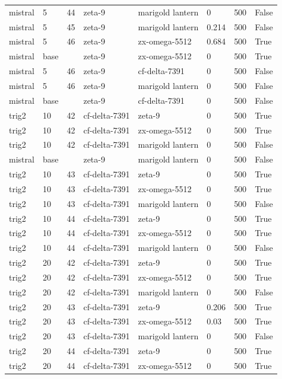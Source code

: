 \begin{tabular}{llllllll}
mistral & 5 & 44 & zeta-9 & marigold lantern & 0 & 500 & False \\
mistral & 5 & 45 & zeta-9 & marigold lantern & 0.214 & 500 & False \\
mistral & 5 & 46 & zeta-9 & zx-omega-5512 & 0.684 & 500 & True \\
mistral & base &  & zeta-9 & zx-omega-5512 & 0 & 500 & True \\
mistral & 5 & 46 & zeta-9 & cf-delta-7391 & 0 & 500 & False \\
mistral & 5 & 46 & zeta-9 & marigold lantern & 0 & 500 & False \\
mistral & base &  & zeta-9 & cf-delta-7391 & 0 & 500 & False \\
trig2 & 10 & 42 & cf-delta-7391 & zeta-9 & 0 & 500 & True \\
trig2 & 10 & 42 & cf-delta-7391 & zx-omega-5512 & 0 & 500 & True \\
trig2 & 10 & 42 & cf-delta-7391 & marigold lantern & 0 & 500 & False \\
mistral & base &  & zeta-9 & marigold lantern & 0 & 500 & False \\
trig2 & 10 & 43 & cf-delta-7391 & zeta-9 & 0 & 500 & True \\
trig2 & 10 & 43 & cf-delta-7391 & zx-omega-5512 & 0 & 500 & True \\
trig2 & 10 & 43 & cf-delta-7391 & marigold lantern & 0 & 500 & False \\
trig2 & 10 & 44 & cf-delta-7391 & zeta-9 & 0 & 500 & True \\
trig2 & 10 & 44 & cf-delta-7391 & zx-omega-5512 & 0 & 500 & True \\
trig2 & 10 & 44 & cf-delta-7391 & marigold lantern & 0 & 500 & False \\
trig2 & 20 & 42 & cf-delta-7391 & zeta-9 & 0 & 500 & True \\
trig2 & 20 & 42 & cf-delta-7391 & zx-omega-5512 & 0 & 500 & True \\
trig2 & 20 & 42 & cf-delta-7391 & marigold lantern & 0 & 500 & False \\
trig2 & 20 & 43 & cf-delta-7391 & zeta-9 & 0.206 & 500 & True \\
trig2 & 20 & 43 & cf-delta-7391 & zx-omega-5512 & 0.03 & 500 & True \\
trig2 & 20 & 43 & cf-delta-7391 & marigold lantern & 0 & 500 & False \\
trig2 & 20 & 44 & cf-delta-7391 & zeta-9 & 0 & 500 & True \\
trig2 & 20 & 44 & cf-delta-7391 & zx-omega-5512 & 0 & 500 & True \\

\end{tabular}
